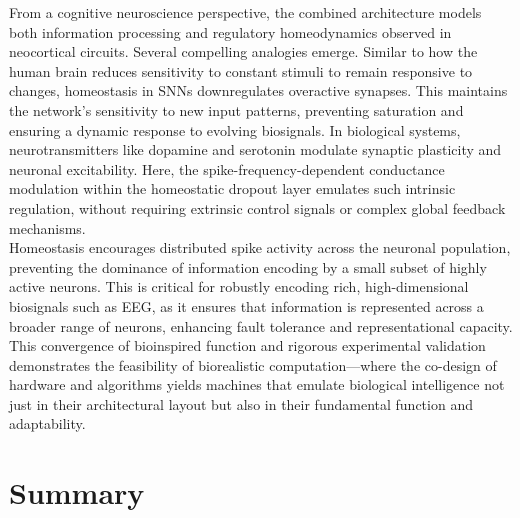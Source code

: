 \noindent From a cognitive neuroscience perspective, the combined architecture models both information processing and regulatory homeodynamics observed in neocortical circuits. Several compelling analogies emerge. Similar to how the human brain reduces sensitivity to constant stimuli to remain responsive to changes, homeostasis in SNNs downregulates overactive synapses. This maintains the network's sensitivity to new input patterns, preventing saturation and ensuring a dynamic response to evolving biosignals. In biological systems, neurotransmitters like dopamine and serotonin modulate synaptic plasticity and neuronal excitability. Here, the spike-frequency-dependent conductance modulation within the homeostatic dropout layer emulates such intrinsic regulation, without requiring extrinsic control signals or complex global feedback mechanisms.\\

\noindent Homeostasis encourages distributed spike activity across the neuronal population, preventing the dominance of information encoding by a small subset of highly active neurons. This is critical for robustly encoding rich, high-dimensional biosignals such as EEG, as it ensures that information is represented across a broader range of neurons, enhancing fault tolerance and representational capacity. This convergence of bioinspired function and rigorous experimental validation demonstrates the feasibility of biorealistic computation—where the co-design of hardware and algorithms yields machines that emulate biological intelligence not just in their architectural layout but also in their fundamental function and adaptability.

\section[Summary]{Summary}


